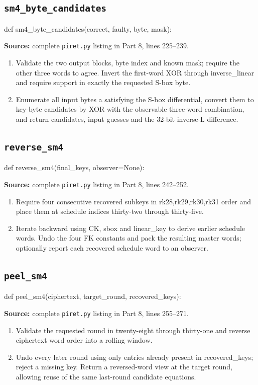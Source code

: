 \subsection{\texttt{sm4\_\allowbreak{}byte\_\allowbreak{}candidates}}
\begin{lightcode}
def sm4_byte_candidates(correct, faulty, byte, mask):
\end{lightcode}
\noindent\textbf{Source:} complete \texttt{piret.py} listing in Part 8, lines 225--239.
\begin{enumerate}
\item Validate the two output blocks, byte index and known mask; require the other three words to agree. Invert the first-word XOR through inverse\_linear and require support in exactly the requested S-box byte.
\item Enumerate all input bytes a satisfying the S-box differential, convert them to key-byte candidates by XOR with the observable three-word combination, and return candidates, input guesses and the 32-bit inverse-L difference.
\end{enumerate}
\subsection{\texttt{reverse\_\allowbreak{}sm4}}
\begin{lightcode}
def reverse_sm4(final_keys, observer=None):
\end{lightcode}
\noindent\textbf{Source:} complete \texttt{piret.py} listing in Part 8, lines 242--252.
\begin{enumerate}
\item Require four consecutive recovered subkeys in rk28,rk29,rk30,rk31 order and place them at schedule indices thirty-two through thirty-five.
\item Iterate backward using CK, sbox and linear\_key to derive earlier schedule words. Undo the four FK constants and pack the resulting master words; optionally report each recovered schedule word to an observer.
\end{enumerate}
\subsection{\texttt{peel\_\allowbreak{}sm4}}
\begin{lightcode}
def peel_sm4(ciphertext, target_round, recovered_keys):
\end{lightcode}
\noindent\textbf{Source:} complete \texttt{piret.py} listing in Part 8, lines 255--271.
\begin{enumerate}
\item Validate the requested round in twenty-eight through thirty-one and reverse ciphertext word order into a rolling window.
\item Undo every later round using only entries already present in recovered\_keys; reject a missing key. Return a reversed-word view at the target round, allowing reuse of the same last-round candidate equations.
\end{enumerate}
